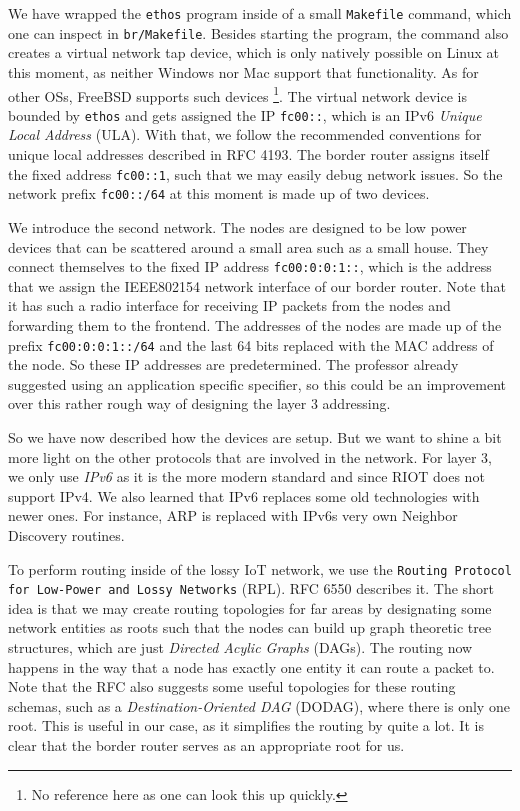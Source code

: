 \documentclass[acmtog, language=english, nonacm]{acmart}
\begin{document}
    We have wrapped the \texttt{ethos} program inside of a small \texttt{Makefile} command, which one can inspect in \texttt{br/Makefile}. Besides starting the program, the command also creates a virtual network tap device, which is only natively possible on Linux at this moment, as neither Windows nor Mac support that functionality. As for other OSs, FreeBSD supports such devices \footnote{No reference here as one can look this up quickly.}. The virtual network device is bounded by \texttt{ethos} and gets assigned the IP \texttt{fc00::}, which is an IPv6 \emph{Unique Local Address} (ULA). With that, we follow the recommended conventions for unique local addresses described in RFC 4193. The border router assigns itself the fixed address \texttt{fc00::1}, such that we may easily debug network issues. So the network prefix \texttt{fc00::/64} at this moment is made up of two devices.

    We introduce the second network. The nodes are designed to be low power devices that can be scattered around a small area such as a small house. They connect themselves to the fixed IP address \texttt{fc00:0:0:1::}, which is the address that we assign the IEEE802154 network interface of our border router. Note that it has such a radio interface for receiving IP packets from the nodes and forwarding them to the frontend. The addresses of the nodes are made up of the prefix \texttt{fc00:0:0:1::/64} and the last 64 bits replaced with the MAC address of the node. So these IP addresses are predetermined. The professor already suggested using an application specific specifier, so this could be an improvement over this rather rough way of designing the layer 3 addressing.

    So we have now described how the devices are setup. But we want to shine a bit more light on the other protocols that are involved in the network. For layer 3, we only use \emph{IPv6} as it is the more modern standard and since RIOT does not support IPv4. We also learned that IPv6 replaces some old technologies with newer ones. For instance, ARP is replaced with IPv6s very own Neighbor Discovery routines.
    
    To perform routing inside of the lossy IoT network, we use the \texttt{Routing Protocol for Low-Power and Lossy Networks} (RPL). RFC 6550 describes it. The short idea is that we may create routing topologies for far areas by designating some network entities as roots such that the nodes can build up graph theoretic tree structures, which are just \emph{Directed Acylic Graphs} (DAGs). The routing now happens in the way that a node has exactly one entity it can route a packet to. Note that the RFC also suggests some useful topologies for these routing schemas, such as a \emph{Destination-Oriented DAG} (DODAG), where there is only one root. This is useful in our case, as it simplifies the routing by quite a lot. It is clear that the border router serves as an appropriate root for us.
\end{document}
